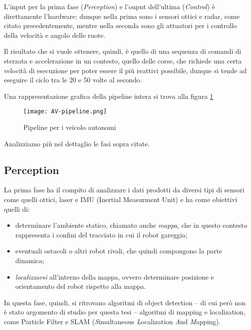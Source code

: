 L'input per la prima fase (\textit{Perception}) e l'ouput dell'ultima (\textit{Control})
è direttamente l'hardware: dunque nella prima sono i sensori ottici e radar, come citato precedentemente,
mentre nella seconda sono gli attuatori per i controllo della velocità e angolo delle ruote.

Il risultato che si vuole ottenere, quindi, è quello di una sequenza di comandi di sterzata e accelerazione
in un contesto, quello delle corse, che richiede una certa velocità di esecuzione per poter essere
il più reattivi possibile, dunque si tende ad eseguire il ciclo tra le 20 e 50 volte al secondo.

\noindent Una rappresentazione grafica della pipeline intera si trova alla figura \ref{fig:av-pipeline}\\
\begin{figure}[ht]
\centering
\caption{Pipeline per i veicolo autonomi}
\texttt{[image: AV-pipeline.png]}
\label{fig:av-pipeline}
\end{figure}

Analizziamo più nel dettaglio le fasi sopra citate.
\subsection{Perception}
La prima fase ha il compito di analizzare i dati prodotti da diversi tipi di sensori come quelli
ottici, laser e IMU (Inertial Measurment Unit) e ha come obiettivi quelli di:
\begin{itemize}
	\item determinare l'ambiente statico, chiamato anche \textit{mappa}, che in questo contesto
	      rappresenta i confini del tracciato in cui il robot gareggia;
	\item eventuali ostacoli o altri robot rivali, che quindi compongono la
	      parte dinamica; \item \textit{localizzarsi} all'interno della mappa, ovvero
	      determinare posizione e orientamento del robot rispetto alla mappa.
\end{itemize}

In questa fase, quindi, si ritrovano algoritmi di object detection -- di cui però non è stato argomento
di studio per questa tesi -- algoritmi di mapping e localization, come Particle Filter e SLAM
(\textit{S}imultaneous \textit{L}ocalization \textit{A}nd \textit{M}apping).

